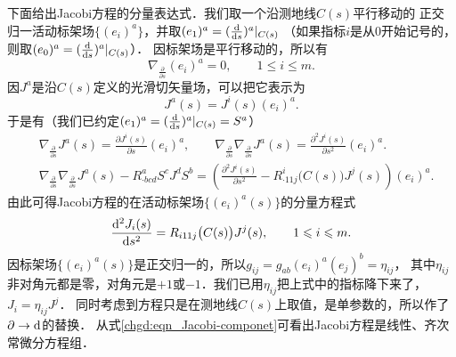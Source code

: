 下面给出Jacobi方程的分量表达式．我们取一个沿测地线$C(s)$平行移动的
正交归一活动标架场$\{(e_i)^a\}$，并取$(e_1)^a=(\frac{{\rm d}}{{\rm d}s})^a|_{C(s)}$
（如果指标$i$是从$0$开始记号的，则取$(e_0)^a=(\frac{{\rm d}}{{\rm d}s})^a|_{C(s)}$）．
因标架场是平行移动的，所以有
\begin{equation}
    \nabla_{\frac{\partial}{\partial s}} (e_i)^a=0,\qquad 1\leqslant i \leqslant m.
\end{equation}
因$J^a$是沿$C(s)$定义的光滑切矢量场，可以把它表示为
\begin{equation}
    J^a(s) =  J^i(s) (e_i)^a .
\end{equation}
于是有（我们已约定$(e_1)^a=(\frac{{\rm d}}{{\rm d}s})^a|_{C(s)}=S^a$）
\begin{align}
    &\nabla_{\frac{\partial}{\partial s}} J^a(s) = \frac{\partial J^i(s)}{\partial s} (e_i)^a, \qquad
    \nabla_{\frac{\partial}{\partial s}} \nabla_{\frac{\partial}{\partial s}} J^a(s) =
      \frac{\partial^2 J^i(s)}{\partial s^2} (e_i)^a. \\
    &\nabla_{\frac{\partial}{\partial s}} \nabla_{\frac{\partial}{\partial s}} J^a(s)
     -R^{a}_{\cdot bcd} {S}^c{J}^d {S}^b = \left( \frac{\partial^2 J^i(s)}{\partial s^2}
     -R^i_{\cdot 11j}\bigl(C(s)\bigr) J^j(s) \right)(e_i)^a .
\end{align}
由此可得Jacobi方程的在活动标架场$\{(e_i)^a(s)\}$的分量方程式
\begin{equation}\label{chgd:eqn_Jacobi-componet}
    \frac{{\rm d}^2 J_i(s)}{{\rm d} s^2} =R_{i11j}\bigl(C(s)\bigr) J^j(s) ,
    \qquad  1\leqslant i \leqslant m.
\end{equation}
因标架场$\{(e_i)^a(s)\}$是正交归一的，所以$g_{ij}=g_{ab}(e_i)^a(e_j)^b=\eta_{ij}$，
其中$\eta_{ij}$非对角元都是零，对角元是$+1$或$-1$．我们已用$\eta_{ij}$把上式中的指标降下来了，
$J_i=\eta_{ij} J^j$．
同时考虑到方程只是在测地线$C(s)$上取值，是单参数的，所以作了$\partial \to {\rm d}$的替换．
从式\eqref{chgd:eqn_Jacobi-componet}可看出Jacobi方程是线性、齐次常微分方程组．

